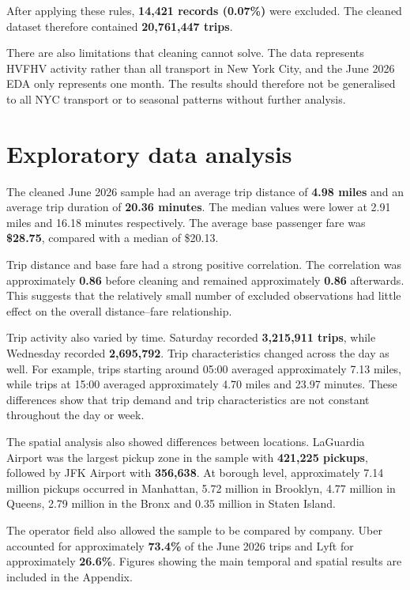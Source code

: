 \documentclass[10pt,twocolumn]{article}
\begin{document}
After applying these rules, \textbf{14,421 records (0.07\%)} were
excluded. The cleaned dataset therefore contained
\textbf{20,761,447 trips}.

There are also limitations that cleaning cannot solve. The data
represents HVFHV activity rather than all transport in New York
City, and the June 2026 EDA only represents one month. The results
should therefore not be generalised to all NYC transport or to
seasonal patterns without further analysis.

\section{Exploratory data analysis}

The cleaned June 2026 sample had an average trip distance of
\textbf{4.98 miles} and an average trip duration of
\textbf{20.36 minutes}. The median values were lower at 2.91 miles
and 16.18 minutes respectively. The average base passenger fare was
\textbf{\$28.75}, compared with a median of \$20.13.

Trip distance and base fare had a strong positive correlation. The
correlation was approximately \textbf{0.86} before cleaning and
remained approximately \textbf{0.86} afterwards. This suggests that
the relatively small number of excluded observations had little
effect on the overall distance--fare relationship.

Trip activity also varied by time. Saturday recorded
\textbf{3,215,911 trips}, while Wednesday recorded
\textbf{2,695,792}. Trip characteristics changed across the day as
well. For example, trips starting around 05:00 averaged approximately
7.13 miles, while trips at 15:00 averaged approximately 4.70 miles
and 23.97 minutes. These differences show that trip demand and trip
characteristics are not constant throughout the day or week.

The spatial analysis also showed differences between locations.
LaGuardia Airport was the largest pickup zone in the sample with
\textbf{421,225 pickups}, followed by JFK Airport with
\textbf{356,638}. At borough level, approximately 7.14 million
pickups occurred in Manhattan, 5.72 million in Brooklyn, 4.77
million in Queens, 2.79 million in the Bronx and 0.35 million in
Staten Island.

The operator field also allowed the sample to be compared by
company. Uber accounted for approximately \textbf{73.4\%} of the
June 2026 trips and Lyft for approximately \textbf{26.6\%}.
Figures showing the main temporal and spatial results are included
in the Appendix.
\end{document}
